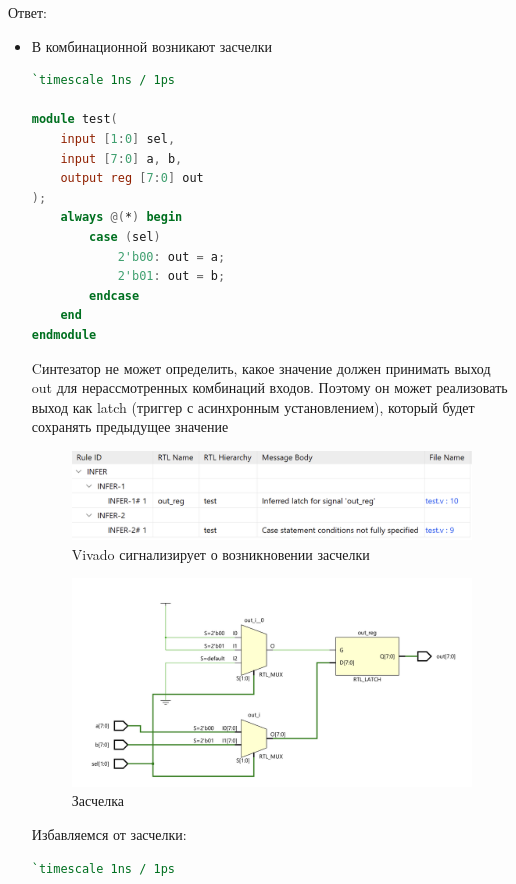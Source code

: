 \documentclass[12pt,onecolumn]{article}
\begin{document}
Ответ:
\begin{itemize} 
    \item {В комбинационной возникают засчелки
    \begin{lstlisting}[language=verilog]
`timescale 1ns / 1ps

module test(
    input [1:0] sel,
    input [7:0] a, b,
    output reg [7:0] out
);
    always @(*) begin
        case (sel)
            2'b00: out = a;
            2'b01: out = b;
        endcase
    end
endmodule
\end{lstlisting}
Cинтезатор не может определить, какое значение должен принимать выход out для нерассмотренных комбинаций входов. Поэтому он может реализовать выход как latch (триггер с асинхронным установлением), который будет сохранять предыдущее значение
\begin{figure}[H]
    \centering
    \includegraphics[width=\textwidth]{image/inferred_latch.png}
    \caption{Vivado сигнализирует о возникновении засчелки}
\end{figure}
\begin{figure}[H]
    \centering
    \includegraphics[width=\textwidth]{image/inferred_latch_rtl.png}
    \caption{Засчелка}
\end{figure}
Избавляемся от засчелки:
\begin{lstlisting}[language=verilog]
`timescale 1ns / 1ps


\end{lstlisting}}
\end{itemize}
\end{document}
